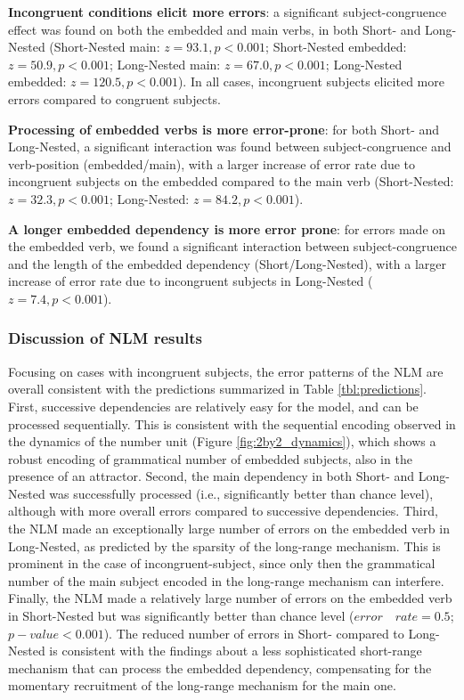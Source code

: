 \begin{APAitemize}
    \item \textbf{Incongruent conditions elicit more errors}: a significant subject-congruence effect was found on both the embedded and main verbs, in both Short- and Long-Nested (Short-Nested main: $z=93.1, p<0.001$; Short-Nested embedded: $z=50.9, p<0.001$; Long-Nested main: $z=67.0, p<0.001$; Long-Nested embedded: $z=120.5, p<0.001$). In all cases, incongruent subjects elicited more errors compared to congruent subjects.
    \item \textbf{Processing of embedded verbs is more error-prone}: for both Short- and Long-Nested, a significant interaction was found between subject-congruence and verb-position (embedded/main), with a larger increase of error rate due to incongruent subjects on the embedded compared to the main verb (Short-Nested: $z=32.3, p<0.001$; Long-Nested: $z=84.2, p<0.001$).
    \item \textbf{A longer embedded dependency is more error prone}: for errors made on the embedded verb, we found a significant interaction between subject-congruence and the length of the embedded dependency (Short/Long-Nested), with a larger increase of error rate due to incongruent subjects in Long-Nested ($z=7.4, p<0.001$).
\end{APAitemize}
 
\vspace{10pt}

\subsubsection{Discussion of NLM results}
Focusing on cases with incongruent subjects, the error patterns of the NLM are overall consistent with the predictions summarized in Table \ref{tbl:predictions}. First, successive dependencies are relatively easy for the model, and can be processed sequentially. This is consistent with the sequential encoding observed in the dynamics of the number unit (Figure \ref{fig:2by2_dynamics}), which shows a robust encoding of grammatical number of embedded subjects, also in the presence of an attractor. Second, the main dependency in both Short- and Long-Nested was successfully processed (i.e., significantly better than chance level), although with more overall errors compared to successive dependencies. Third, the NLM made an exceptionally large number of errors on the embedded verb in Long-Nested, as predicted by the sparsity of the long-range mechanism. This is prominent in the case of incongruent-subject, since only then the grammatical number of the main subject encoded in the long-range mechanism can interfere. Finally, the NLM made a relatively large number of errors on the embedded verb in Short-Nested but was significantly better than chance level ($error \quad rate = 0.5$; $p-value < 0.001$). The reduced number of errors in Short- compared to Long-Nested is consistent with the findings about a less sophisticated short-range mechanism that can process the embedded dependency, compensating for the momentary recruitment of the long-range mechanism for the main one. 

